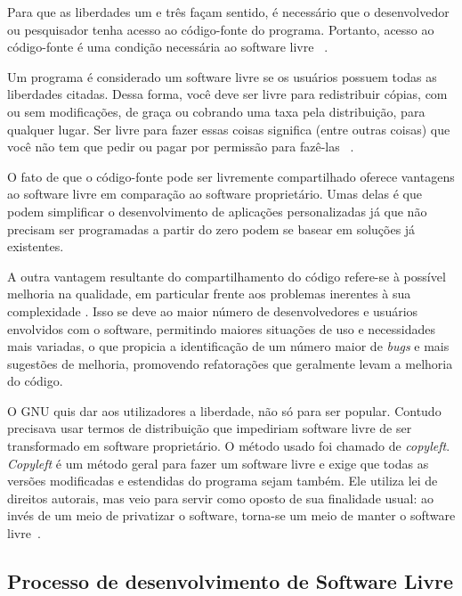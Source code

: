 Para que as liberdades um e três façam sentido, é necessário que o desenvolvedor ou pesquisador tenha acesso ao código-fonte do programa.  Portanto, acesso ao código-fonte é uma condição necessária ao software livre ~\cite{gnu2013}.

Um programa é considerado um software livre se os usuários possuem todas as liberdades citadas. Dessa forma, você deve ser livre para redistribuir cópias, com ou sem modificações, de graça ou cobrando uma taxa pela distribuição, para qualquer lugar. Ser livre para fazer essas coisas significa (entre outras coisas) que você não tem que pedir ou pagar por permissão para fazê-las ~\cite{anaPaula2012}.

O fato de que o código-fonte pode ser livremente compartilhado oferece vantagens ao software livre em comparação ao software proprietário. Umas delas é que podem simplificar o desenvolvimento de aplicações personalizadas já que não precisam ser programadas a partir do zero podem se basear em soluções já existentes.

A outra vantagem resultante do compartilhamento do código refere-se à possível melhoria na qualidade, em particular frente aos problemas inerentes à sua complexidade \cite{catedralBazzar}.
%
Isso se deve ao maior número de desenvolvedores e usuários envolvidos com o software, permitindo maiores situações de uso e necessidades mais variadas, o que propicia a identificação de um número maior de \emph{bugs} e mais sugestões de melhoria, promovendo refatorações que geralmente levam a melhoria do código.

O GNU quis dar aos utilizadores a liberdade, não só para ser popular. Contudo precisava usar termos de distribuição que impediriam software livre de ser transformado em software proprietário. O método usado foi chamado de \emph{copyleft}. \emph{Copyleft} é um método geral para fazer um software livre e exige que todas as versões modificadas e estendidas do programa sejam também. Ele utiliza lei de direitos autorais, mas veio para servir como oposto de sua finalidade usual: ao invés de um meio de privatizar o software, torna-se um meio de manter o software livre~\cite{stallman2009}.

\subsection{Processo de desenvolvimento de Software Livre}
\label{des-soft-livre}

